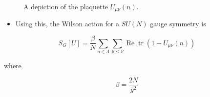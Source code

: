 \begin{figure}
\caption{A depiction of the plaquette $U_{\mu \nu}(n)$.}
\end{figure}

\begin{itemize}
  \item Using this, the Wilson action for a \(S U(N)\) gauge symmetry is
\end{itemize}

\begin{equation}
S_{G}[U]=\frac{\beta}{N} \sum_{n \in \Lambda} \sum_{\mu < \nu} \operatorname{Re} \operatorname{tr}\left(1-U_{\mu \nu}(n)\right)
\end{equation}

where

\begin{equation}
\beta=\frac{2 N}{g^{2}}
\end{equation}

